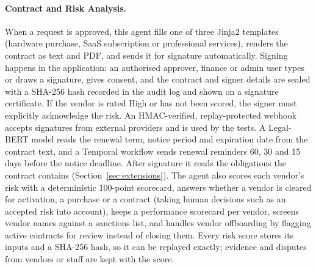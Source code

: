 \paragraph{Contract and Risk Analysis.} When a request is approved, this agent fills one of three Jinja2 templates (hardware purchase, SaaS subscription or professional services), renders the contract as text and PDF, and sends it for signature automatically. Signing happens in the application: an authorised approver, finance or admin user types or draws a signature, gives consent, and the contract and signer details are sealed with a SHA-256 hash recorded in the audit log and shown on a signature certificate. If the vendor is rated High or has not been scored, the signer must explicitly acknowledge the risk. An HMAC-verified, replay-protected webhook accepts signatures from external providers and is used by the tests. A Legal-BERT model reads the renewal term, notice period and expiration date from the contract text, and a Temporal workflow sends renewal reminders 60, 30 and 15 days before the notice deadline. After signature it reads the obligations the contract contains (Section~\ref{sec:extensions}). The agent also scores each vendor's risk with a deterministic 100-point scorecard, answers whether a vendor is cleared for activation, a purchase or a contract (taking human decisions such as an accepted risk into account), keeps a performance scorecard per vendor, screens vendor names against a sanctions list, and handles vendor offboarding by flagging active contracts for review instead of closing them. Every risk score stores its inputs and a SHA-256 hash, so it can be replayed exactly; evidence and disputes from vendors or staff are kept with the score.

